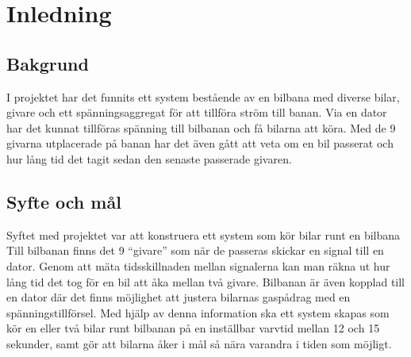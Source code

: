 \section{Inledning}

\subsection{Bakgrund}
I projektet har det funnits ett system bestående av en bilbana med diverse bilar, givare och ett spänningsaggregat för att tillföra ström till banan. Via en dator har det kunnat tillföras spänning till bilbanan och få bilarna att köra. Med de 9 givarna utplacerade på banan har det även gått att veta om en bil passerat och hur lång tid det tagit sedan den senaste passerade givaren.

\subsection{Syfte och mål}
Syftet med projektet var att konstruera ett system som kör bilar runt en bilbana
Till bilbanan finns det 9 ``givare'' som när
de passeras skickar en signal till en dator. Genom att mäta tidsskillnaden
mellan signalerna kan man räkna ut hur lång tid det tog för en bil att åka
mellan två givare. Bilbanan är även kopplad till en dator där det finns
möjlighet att justera bilarnas gaspådrag med en spänningstillförsel. Med hjälp
av denna information ska ett system skapas som kör en eller två bilar runt
bilbanan på en inställbar varvtid mellan 12 och 15 sekunder, samt gör att
bilarna åker i mål så nära varandra i tiden som möjligt.
